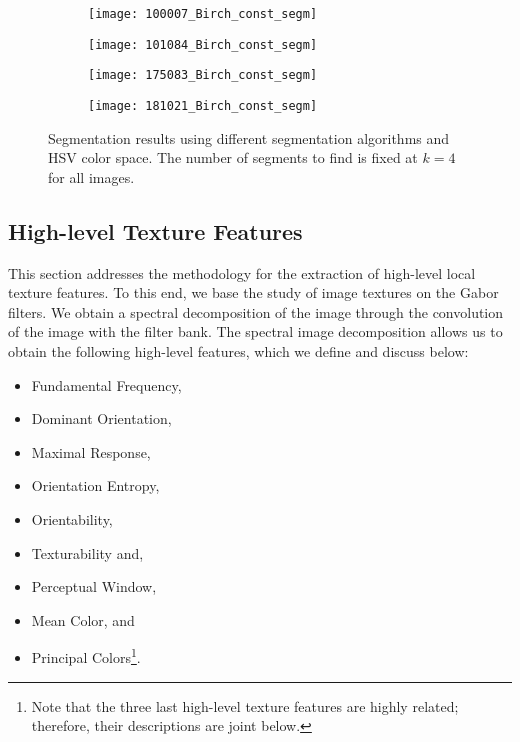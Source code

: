 \begin{figure}[!ht]
    \begin{subfigure}[t]{\textwidth+20pt\relax}
    	\centering
    	\texttt{[image: 100007\_Birch\_const\_segm]} 
    \end{subfigure}      
    \begin{subfigure}[b]{0.23\textwidth}
    	\centering
        \texttt{[image: 101084\_Birch\_const\_segm]}
    \end{subfigure}
    \begin{subfigure}[b]{0.23\textwidth}
    	\centering
        \texttt{[image: 175083\_Birch\_const\_segm]}
    \end{subfigure}
    \begin{subfigure}[b]{0.23\textwidth}
    	\centering
        \texttt{[image: 181021\_Birch\_const\_segm]}
    \end{subfigure}     
	\caption{Segmentation results using different segmentation algorithms and HSV color space. The number of segments to find is fixed at $ k = 4 $ for all images. }\label{fig:BSD_clustering_results}    
\end{figure}


\subsection{High-level Texture Features}\label{sec:high_level_features}
This section addresses the methodology for the extraction of high-level local texture features. To this end, we base the study of image textures on the Gabor filters. We obtain a spectral decomposition of the image through the convolution of the image with the filter bank. The spectral image decomposition allows us to obtain the following high-level features, which we define and discuss below:

\begin{itemize}
	\item Fundamental Frequency,
	\item Dominant Orientation,
	\item Maximal Response,
	\item Orientation Entropy,
	\item Orientability,
	\item Texturability and, 
	\item Perceptual Window,
	\item Mean Color, and 
	\item Principal Colors\footnote{Note that the three last high-level texture features are highly related; therefore, their descriptions are joint below.}.
\end{itemize}


